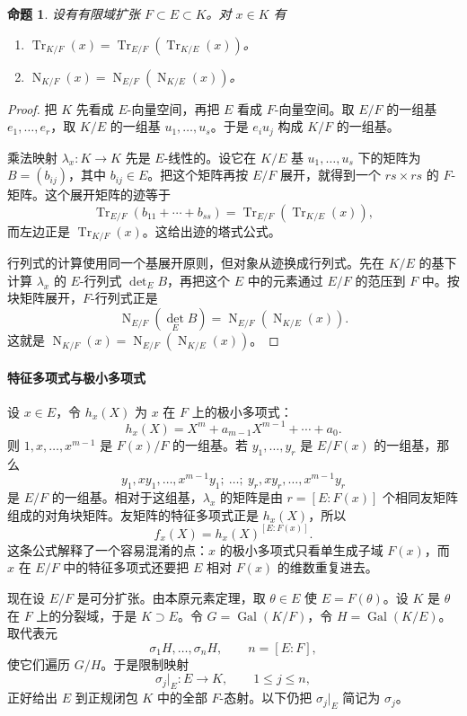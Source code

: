 \documentclass[11pt,a4paper,openany]{ctexbook}
\numberwithin{equation}{chapter}
\newcommand{\Gal}{\operatorname{Gal}}
\newcommand{\Tr}{\operatorname{Tr}}
\newcommand{\Nm}{\operatorname{N}}
\theoremstyle{plain}
\newtheorem{proposition}[theorem]{命题}
\theoremstyle{definition}
\theoremstyle{remark}
\begin{document}
\begin{proposition}
设有有限域扩张 $F\subset E\subset K$。对 $x\in K$ 有
\begin{enumerate}[label=(\arabic*)]
\item $\Tr_{K/F}(x)=\Tr_{E/F}(\Tr_{K/E}(x))$。
\item $\Nm_{K/F}(x)=\Nm_{E/F}(\Nm_{K/E}(x))$。
\end{enumerate}
\end{proposition}

\begin{proof}
把 $K$ 先看成 $E$-向量空间，再把 $E$ 看成 $F$-向量空间。取 $E/F$ 的一组基 $e_1,\dots,e_r$，取 $K/E$ 的一组基 $u_1,\dots,u_s$。于是 $e_i u_j$ 构成 $K/F$ 的一组基。

乘法映射 $\lambda_x:K\to K$ 先是 $E$-线性的。设它在 $K/E$ 基 $u_1,\dots,u_s$ 下的矩阵为 $B=(b_{ij})$，其中 $b_{ij}\in E$。把这个矩阵再按 $E/F$ 展开，就得到一个 $rs\times rs$ 的 $F$-矩阵。这个展开矩阵的迹等于
\[
\Tr_{E/F}(b_{11}+\cdots+b_{ss})
=\Tr_{E/F}(\Tr_{K/E}(x)),
\]
而左边正是 $\Tr_{K/F}(x)$。这给出迹的塔式公式。

行列式的计算使用同一个基展开原则，但对象从迹换成行列式。先在 $K/E$ 的基下计算 $\lambda_x$ 的 $E$-行列式 $\det_E B$，再把这个 $E$ 中的元素通过 $E/F$ 的范压到 $F$ 中。按块矩阵展开，$F$-行列式正是
\[
\Nm_{E/F}(\det_E B)=\Nm_{E/F}(\Nm_{K/E}(x)).
\]
这就是 $\Nm_{K/F}(x)=\Nm_{E/F}(\Nm_{K/E}(x))$。
\end{proof}

\paragraph{特征多项式与极小多项式}
设 $x\in E$，令 $h_x(X)$ 为 $x$ 在 $F$ 上的极小多项式：
\[
h_x(X)=X^m+a_{m-1}X^{m-1}+\cdots+a_0.
\]
则 $1,x,\dots,x^{m-1}$ 是 $F(x)/F$ 的一组基。若 $y_1,\dots,y_r$ 是 $E/F(x)$ 的一组基，那么
\[
y_1,xy_1,\dots,x^{m-1}y_1;\ \dots;\ y_r,xy_r,\dots,x^{m-1}y_r
\]
是 $E/F$ 的一组基。相对于这组基，$\lambda_x$ 的矩阵是由 $r=[E:F(x)]$ 个相同友矩阵组成的对角块矩阵。友矩阵的特征多项式正是 $h_x(X)$，所以
\[
f_x(X)=h_x(X)^{[E:F(x)]}.
\]
这条公式解释了一个容易混淆的点：$x$ 的极小多项式只看单生成子域 $F(x)$，而 $x$ 在 $E/F$ 中的特征多项式还要把 $E$ 相对 $F(x)$ 的维数重复进去。

现在设 $E/F$ 是可分扩张。由本原元素定理，取 $\theta\in E$ 使 $E=F(\theta)$。设 $K$ 是 $\theta$ 在 $F$ 上的分裂域，于是 $K\supset E$。令 $G=\Gal(K/F)$，令 $H=\Gal(K/E)$。取代表元
\[
\sigma_1H,\dots,\sigma_nH,\qquad n=[E:F],
\]
使它们遍历 $G/H$。于是限制映射
\[
\sigma_j|_E:E\longrightarrow K,\qquad 1\le j\le n,
\]
正好给出 $E$ 到正规闭包 $K$ 中的全部 $F$-态射。以下仍把 $\sigma_j|_E$ 简记为 $\sigma_j$。
\end{document}

